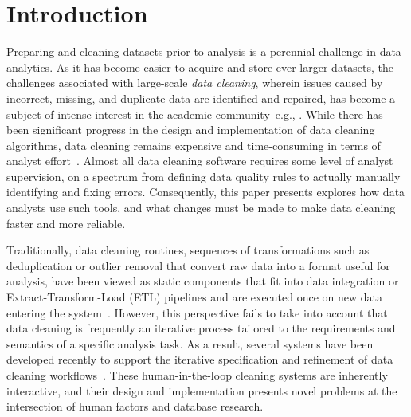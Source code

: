 \section{Introduction}
Preparing and cleaning datasets prior to analysis is a perennial challenge in data analytics.
As it has become easier to acquire and store ever larger datasets, the challenges associated with large-scale \textit{data cleaning}, wherein issues caused by incorrect, missing, and duplicate data are identified and repaired, has become a subject of intense interest in the academic community~e.g., \cite{wisteria, ChuKATARA, BigDansing}.
While there has been significant progress in the design and implementation of data cleaning algorithms, data cleaning remains expensive and time-consuming in terms of analyst effort~\cite{NYTimes}.
Almost all data cleaning software requires some level of analyst supervision, on a spectrum from defining data quality rules to actually manually identifying and fixing errors.
Consequently, this paper presents explores how data analysts use such tools, and what changes must be made to make data cleaning faster and more reliable.

Traditionally, data cleaning routines, sequences of transformations such as deduplication or outlier removal that convert raw data into a format useful for analysis, have been viewed as static components that fit into data integration or Extract-Transform-Load (ETL) pipelines and are executed once on new data entering the system~\cite{apachefalcon, informatica, talend, nadeef}.
However, this perspective fails to take into account that data cleaning is frequently an iterative process tailored to the requirements and semantics of a specific analysis task.
As a result, several systems have been developed recently to support the iterative specification and refinement of data cleaning workflows~\cite{trifacta, 2011-wrangler, openrefine, wisteria}.
These human-in-the-loop cleaning systems are inherently interactive, and their design and implementation presents novel problems at the intersection of human factors and database research.




